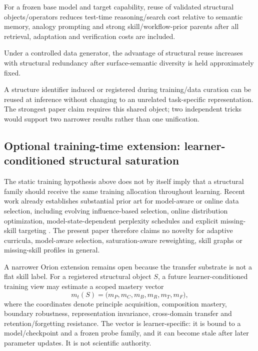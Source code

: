 \begin{hypothesis}
For a frozen base model and target capability, reuse of validated structural objects/operators reduces test-time reasoning/search cost relative to semantic memory, analogy prompting and strong skill/workflow-prior parents after all retrieval, adaptation and verification costs are included.
\end{hypothesis}

\begin{hypothesis}
Under a controlled data generator, the advantage of structural reuse increases with structural redundancy after surface-semantic diversity is held approximately fixed.
\end{hypothesis}

\begin{hypothesis}
A structure identifier induced or registered during training/data curation can be reused at inference without changing to an unrelated task-specific representation. The strongest paper claim requires this shared object; two independent tricks would support two narrower results rather than one unification.
\end{hypothesis}

\subsection{Optional training-time extension: learner-conditioned structural saturation}
\label{sec:learner-conditioned-saturation}

The static training hypothesis above does not by itself imply that a structural family should receive the same training allocation throughout learning. Recent work already establishes substantial prior art for model-aware or online data selection, including evolving influence-based selection, online distribution optimization, model-state-dependent perplexity schedules and explicit missing-skill targeting \cite{yu2024mates,jiang2025ado,elhattami2025sst,he2026stat}. The present paper therefore claims no novelty for adaptive curricula, model-aware selection, saturation-aware reweighting, skill graphs or missing-skill profiles in general.

A narrower Orion extension remains open because the transfer substrate is not a flat skill label. For a registered structural object $S$, a future learner-conditioned training view may estimate a scoped mastery vector
\[
m_t(S)=\bigl(m_P,m_C,m_B,m_R,m_T,m_F\bigr),
\]
where the coordinates denote principle acquisition, composition mastery, boundary robustness, representation invariance, cross-domain transfer and retention/forgetting resistance. The vector is learner-specific: it is bound to a model/checkpoint and a frozen probe family, and it can become stale after later parameter updates. It is not scientific authority.

